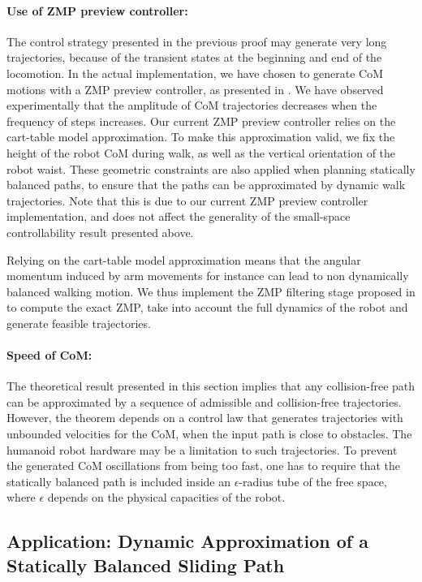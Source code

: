 \paragraph{Use of ZMP preview controller:}
The control strategy presented in the previous proof may generate very
long trajectories, because of the transient states at the beginning
and end of the locomotion. In the actual implementation, we have
chosen to generate CoM motions with a ZMP preview controller, as
presented in \cite{kaji03}.  We have observed experimentally that the
amplitude of CoM trajectories decreases when the frequency of steps
increases. Our current ZMP preview controller relies on the cart-table
model approximation.  To make this approximation valid, we fix the
height of the robot CoM during walk, as well as the vertical
orientation of the robot waist. These geometric constraints are also
applied when planning statically balanced paths, to ensure that the
paths can be approximated by dynamic walk trajectories. Note that this
is due to our current ZMP preview controller implementation, and does
not affect the generality of the small-space controllability result
presented above.

Relying on the cart-table model approximation means that the angular
momentum induced by arm movements for instance can lead to non
dynamically balanced walking motion. We thus implement the ZMP
filtering stage proposed in \cite{kaji03} to compute the exact ZMP,
take into account the full dynamics of the robot and generate feasible
trajectories.

\paragraph{Speed of CoM:}
The theoretical result presented in this section implies that any
collision-free path can be approximated by a sequence of admissible
and collision-free trajectories. However, the theorem depends on a
control law that generates trajectories with unbounded velocities for
the CoM, when the input path is close to obstacles. The humanoid robot
hardware may be a limitation to such trajectories. To prevent the
generated CoM oscillations from being too fast, one has to require
that the statically balanced path is included inside an
$\epsilon$-radius tube of the free space, where $\epsilon$ depends on
the physical capacities of the robot.

\subsection{Application: Dynamic Approximation of a Statically Balanced Sliding Path}
\label{sec:ssc-application}

